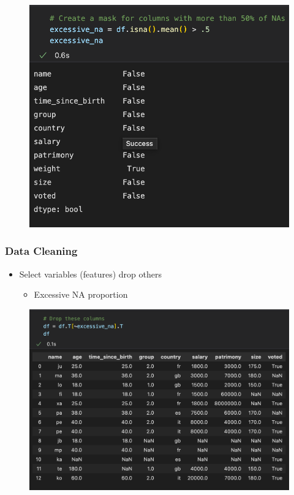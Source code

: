 \begin{frame}
\begin{minipage}{0.58\linewidth}
\begin{figure}[H]
         \includegraphics[scale=.35]{../images/illustrations/data_cleaning_detect_columns_excessive_na.png}
      \end{figure}
   \end{minipage}
\end{frame}

\begin{frame}\frametitle{Data Cleaning}
   \begin{itemize}
      \item Select variables (features) drop others
      \begin{itemize}
         \item Excessive NA proportion
      \end{itemize}
   \end{itemize}
   \vspace{.5cm}
   \begin{minipage}{0.38\linewidth}
      \begin{figure}[H]
         \includegraphics[scale=.35]{../images/illustrations/data_cleaning_drop_columns_excessive_na.png}
      \end{figure}
   \end{minipage}
\end{frame}


